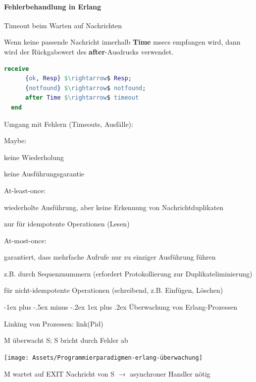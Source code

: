 \documentclass[10pt]{article}
\makeatletter
\renewcommand{\subsubsection}{\@startsection{subsubsection}{3}{0mm}%
                                {-1ex plus -.5ex minus -.2ex}%
                                {1ex plus .2ex}%
                                {\normalfont\small\bfseries}}
\makeatother
\begin{document}
\paragraph{Fehlerbehandlung in Erlang}

\begin{itemize*}
  \item Timeout beim Warten auf Nachrichten
  \item Wenn keine passende Nachricht innerhalb \textbf{Time} msecs empfangen wird, dann wird der Rückgabewert des \textbf{after}-Ausdrucks verwendet.
\end{itemize*}
\begin{lstlisting}[language=erlang]
  receive
      {ok, Resp} $\rightarrow$ Resp;
      {notfound} $\rightarrow$ notfound;
      after Time $\rightarrow$ timeout
  end
  \end{lstlisting}

Umgang mit Fehlern (Timeouts, Ausfälle):
\begin{itemize*}
  \item Maybe:
  \begin{itemize*}
    \item keine Wiederholung
    \item keine Ausführungsgarantie
  \end{itemize*}
  \item At-least-once:
  \begin{itemize*}
    \item wiederholte Ausführung, aber keine Erkennung von Nachrichtduplikaten
    \item nur für idempotente Operationen (Lesen)
  \end{itemize*}
  \item At-most-once:
  \begin{itemize*}
    \item garantiert, dass mehrfache Aufrufe nur zu einziger Ausführung führen
    \item z.B. durch Sequenznummern (erfordert Protokollierung zur Duplikateliminierung)
    \item für nicht-idempotente Operationen (schreibend, z.B. Einfügen, Löschen)
  \end{itemize*}
\end{itemize*}

\subsubsection{Überwachung von Erlang-Prozessen}
\begin{itemize*}
  \item Linking von Prozessen: \color{green}link\color{blue}(Pid) \color{black}
  \item M überwacht S; S bricht durch Fehler ab
  \begin{center}
    \centering
    \texttt{[image: Assets/Programmierparadigmen-erlang-überwachung]}
  \end{center}
  \item M wartet auf EXIT Nachricht von S $\rightarrow$ asynchroner Handler nötig
\end{itemize*}
\end{document}

